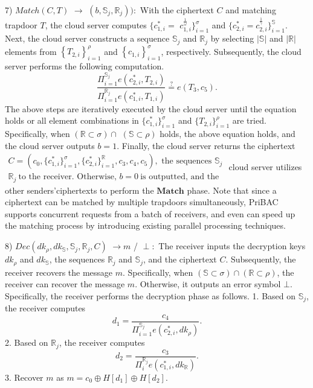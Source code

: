 \documentclass[runningheads]{llncs}
\begin{document}
7) $Match( C, T)$ $\to$ $( b, \mathbb{S} _j, \mathbb{R} _j) ) {: }$ With the ciphertext $C$ and matching trapdoor $T$, the cloud server computes $\{c_{1,i}^*=$ $c_{1,i}^{\frac1\omega}\}_{i=1}^{\sigma}$ and $\{c_{2,i}^*=c_{2,i}^{\frac1\gamma}\}_{i=1}^{\mathbb{S}}.$ Next, the cloud server constructs a sequence $\mathbb{S}_j$ and $\mathbb{R}_j$ by selecting $|\mathbb{S}|$ and $|\mathbb{R}|$ elements from $\left\{T_{2,i}\right\}_{i=1}^\rho$ and $\left\{c_{1,i}\right\}_{i=1}^\sigma$, respectively. Subsequently, the cloud server performs the following computation.
$$\frac{\Pi_{i=1}^{\mathbb{S}_j}e(c_{2,i}^*,T_{2,i})}{\Pi_{i=1}^{\mathbb{R}_j}e(c_{1,i}^*,T_{1,i})}\overset{?}{\operatorname*{=}}e(T_3,c_5).$$
The above steps are iteratively executed by the cloud server until the equation holds or all element combinations in $\{c_{1,i}^*\}_{i=1}^\sigma$ and $\{T_{2,i}\}_{i=1}^\rho$ are tried. Specifically, when $(\mathbb{R}\subset\sigma)\cap$ $(\mathbb{S}\subset\rho)$ holds, the above equation holds, and the cloud server outputs $b=1.$ Finally, the cloud server returns the ciphertext $\begin{array}{l}C=(c_0,\{c_{1,i}^*\}_{i=1}^\sigma,\{c_{2,i}^*\}_{i=1}^\mathbb{R},c_3,c_4,c_5),\text{ the sequences }\mathbb{S}_j\\\mathbb{R}_j\:\text{to the receiver. Otherwise, }b=0\:\text{is outputted, and the}\end{array}$ cloud server utilizes other senders’ciphertexts to perform the $\textbf{Match}$ phase. Note that since a ciphertext can be matched by multiple trapdoors simultaneously, PriBAC supports concurrent requests from a batch of receivers, and even can speed up the matching process by introducing existing parallel processing techniques.

8) $Dec( dk_\rho , dk_\mathbb{S} , \mathbb{S} _j, \mathbb{R} _j, C)$ $\to m$ / $\perp :$ The receiver inputs the decryption keys $dk_\rho$ and $dk_\mathbb{S}$, the sequences $\mathbb{R}_j$ and $\mathbb{S}_j$, and the ciphertext $C.$ Subsequently, the receiver recovers the message $m.$ Specifically, when $(\mathbb{S}\subset\sigma)\cap(\mathbb{R}\subset\rho)$, the receiver can recover the message $m.$ Otherwise, it outputs an error symbol $\bot.$ Specifically, the receiver performs the decryption phase as follows.
1. Based on $\mathbb{S}_j$, the receiver computes
$$d_1=\frac{c_4}{\Pi_{i=1}^{\mathbb{S}_j}e(c_{2,i}^*,dk_\rho)}.$$
2. Based on $\mathbb{R}_j$, the receiver computes
$$d_2=\frac{c_3}{\Pi_i^{\mathbb{R}_j}e(c_{1,i}^*,dk_\mathbb{R})}.$$
3. Recover $m$ as $m=c_0\oplus H[d_1]\oplus H[d_2].$
\end{document}
